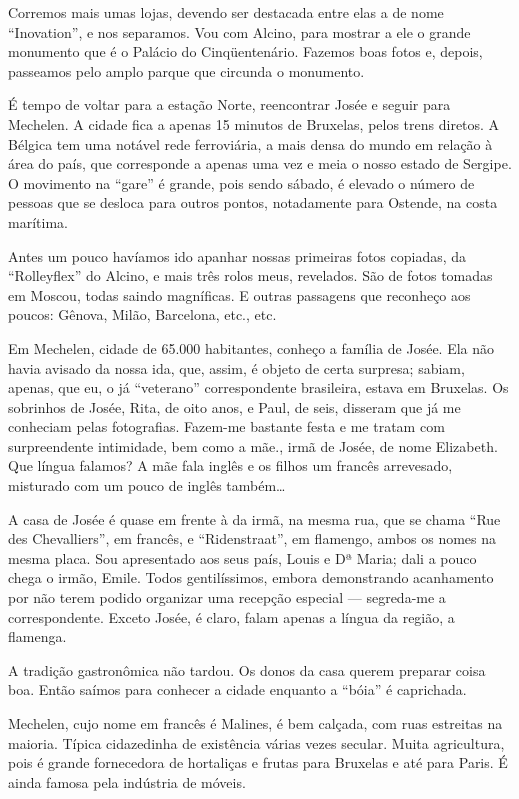 Corremos mais umas lojas, devendo ser destacada entre elas a de nome ``Inovation'', e nos separamos. Vou com Alcino, para mostrar a ele o grande monumento que é o Palácio do Cinqüentenário. Fazemos boas fotos e, depois, passeamos pelo amplo parque que circunda o monumento.

É tempo de voltar para a estação Norte, reencontrar Josée e seguir para Mechelen. A cidade fica a apenas 15 minutos de Bruxelas, pelos trens diretos. A Bélgica tem uma notável rede ferroviária, a mais densa do mundo em relação à área do país, que corresponde a apenas uma vez e meia o nosso estado de Sergipe. O movimento na ``gare'' é grande, pois sendo sábado, é elevado o número de pessoas que se desloca para outros pontos, notadamente para Ostende, na costa marítima.

Antes um pouco havíamos ido apanhar nossas primeiras fotos copiadas, da ``Rolleyflex'' do Alcino, e mais três rolos meus, revelados. São de fotos tomadas em Moscou, todas saindo magníficas. E outras passagens que reconheço aos poucos: Gênova, Milão, Barcelona, etc., etc.

Em Mechelen, cidade de 65.000 habitantes, conheço a família de Josée. Ela não havia avisado da nossa ida, que, assim, é objeto de certa surpresa; sabiam, apenas, que eu, o já ``veterano'' correspondente brasileira, estava em Bruxelas. Os sobrinhos de Josée, Rita, de oito anos, e Paul, de seis, disseram que já me conheciam pelas fotografias. Fazem-me bastante festa e me tratam com surpreendente intimidade, bem como a mãe., irmã de Josée, de nome Elizabeth. Que língua falamos? A mãe fala inglês e os filhos um francês arrevesado, misturado com um pouco de inglês também\ldots

A casa de Josée é quase em frente à da irmã, na mesma rua, que se chama ``Rue des Chevalliers'', em francês, e ``Ridenstraat'', em flamengo, ambos os nomes na mesma placa. Sou apresentado aos seus país, Louis e Dª Maria; dali a pouco chega o irmão, Emile. Todos gentilíssimos, embora demonstrando acanhamento por não terem podido organizar uma recepção especial --- segreda-me a correspondente. Exceto Josée, é claro, falam apenas a língua da região, a flamenga.

A tradição gastronômica não tardou. Os donos da casa querem preparar coisa boa. Então saímos para conhecer a cidade enquanto a ``bóia'' é caprichada.

Mechelen, cujo nome em francês é Malines, é bem calçada, com ruas estreitas na maioria. Típica cidazedinha de existência várias vezes secular. Muita agricultura, pois é grande fornecedora de hortaliças e frutas para Bruxelas e até para Paris. É ainda famosa pela indústria de móveis.

